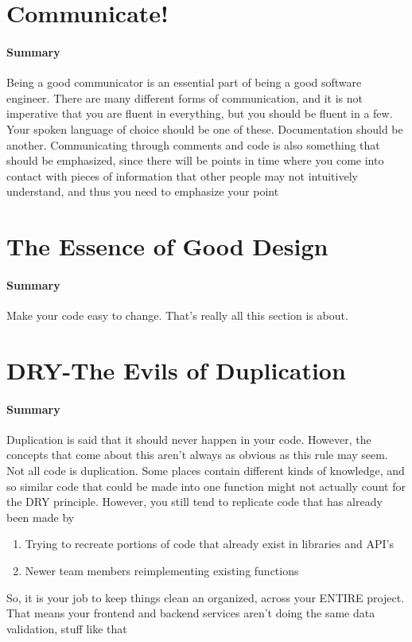 \documentclass{article}
\begin{document}
\section{Communicate!}
    \paragraph{Summary}
    Being a good communicator is an essential part of being a good software engineer. There are many different forms of communication, and it is not imperative that you are fluent in everything, but you should be fluent in a few. Your spoken language of choice should be one of these. Documentation should be another. Communicating through comments and code is also something that should be emphasized, since there will be points in time where you come into contact with pieces of information that other people may not intuitively understand, and thus you need to emphasize your point

\section{The Essence of Good Design}
    \paragraph{Summary}
    Make your code easy to change. That's really all this section is about.

\section{DRY-The Evils of Duplication}
    \paragraph{Summary}
    Duplication is said that it should never happen in your code. However, the concepts that come about this aren't always as obvious as this rule may seem. Not all code is duplication. Some places contain different kinds of knowledge, and so similar code that could be made into one function might not actually count for the DRY principle. However, you still tend to replicate code that has already been made by 
    \begin{enumerate}
        \item Trying to recreate portions of code that already exist in libraries and API's
        \item Newer team members reimplementing existing functions
    \end{enumerate}
    So, it is your job to keep things clean an organized, across your ENTIRE project. That means your frontend and backend services aren't doing the same data validation, stuff like that
\end{document}
